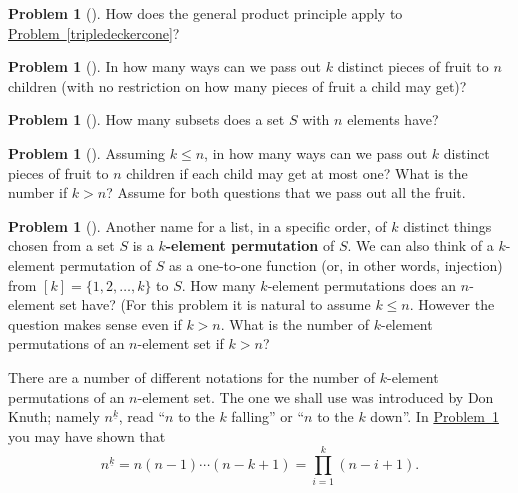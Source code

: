 \documentclass[10pt,]{book}
\newcommand{\terminology}[1]{\textbf{#1}}
\theoremstyle{plain}
\theoremstyle{definition}
\newtheorem{activity}[project]{Problem}
\theoremstyle{definition}
\numberwithin{equation}{chapter}
\begin{document}
\begin{activity}[] \label{activity-16}
How does the general product principle apply to \hyperref[tripledeckercone]{Problem~\ref{tripledeckercone}}?%
\end{activity}
\begin{activity}[] \label{activity-17}
In how many ways can we pass out \(k\) distinct pieces of fruit to \(n\) children (with no restriction on how many pieces of fruit a child may get)?%
\end{activity}
\begin{activity}[] \label{SubsetsFirstTime}
How many subsets does a set \(S\) with \(n\) elements have?%
\end{activity}
\begin{activity}[] \label{activity-19}
Assuming \(k\le n\), in how many ways can we pass out \(k\) distinct pieces of fruit to \(n\) children if each child may get at most one? What is the number if \(k>n\)? Assume for both questions that we pass out all the fruit.%
\end{activity}
\begin{activity}[] \label{kelementpermutation}
Another name for a list, in a specific order, of \(k\) distinct things chosen from a set \(S\) is a \terminology{\(k\)-element permutation} of \(S\). We can also think of a \(k\)-element permutation of \(S\) as a one-to-one function (or, in other words, injection) from \([k]=\{1,2,\ldots, k\}\) to \(S\). How many \(k\)-element permutations does an \(n\)-element set have? (For this problem it is natural to assume \(k\le n\). However the question makes sense even if \(k>n\). What is the number of \(k\)-element permutations of an \(n\)-element set if \(k>n\)?%
\end{activity}
There are a number of different notations for the number of \(k\)-element permutations of an \(n\)-element set. The one we shall use was introduced by Don Knuth; namely \(n^{\underline{k}}\), read ``\(n\) to the \(k\) falling'' or ``\(n\) to the \(k\) down''. In \hyperref[kelementpermutation]{Problem~\ref{kelementpermutation}} you may have shown that%
\begin{equation}
n^{\underline{k}} =n(n-1)\cdots (n-k+1)= \prod_{i=1}^k(
n-i+1).\label{productnotation}
\end{equation}
\end{document}
